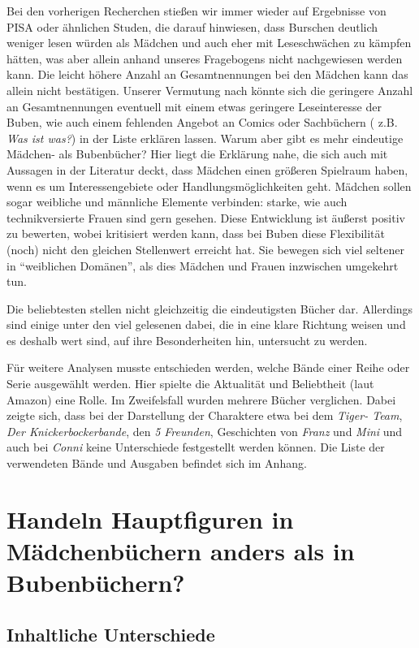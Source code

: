 Bei den vorherigen Recherchen stießen wir immer wieder auf Ergebnisse
von PISA oder ähnlichen Studen, die darauf hinwiesen, dass Burschen
deutlich weniger lesen würden als Mädchen und auch eher mit
Leseschwächen zu kämpfen hätten, was aber allein anhand unseres
Fragebogens nicht nachgewiesen werden kann. Die leicht höhere Anzahl an
Gesamtnennungen bei den Mädchen kann das allein nicht bestätigen.
Unserer Vermutung nach könnte sich die geringere Anzahl an
Gesamtnennungen eventuell mit einem etwas geringere Leseinteresse der
Buben, wie auch einem fehlenden Angebot an Comics oder Sachbüchern (
z.B. \emph{Was ist was?}) in der Liste erklären lassen. Warum aber gibt
es mehr eindeutige Mädchen- als Bubenbücher? Hier liegt die Erklärung
nahe, die sich auch mit Aussagen in der Literatur deckt, dass Mädchen
einen größeren Spielraum haben, wenn es um Interessengebiete oder
Handlungsmöglichkeiten geht. Mädchen sollen sogar weibliche und
männliche Elemente verbinden: starke, wie auch technikversierte Frauen
sind gern gesehen. Diese Entwicklung ist äußerst positiv zu bewerten,
wobei kritisiert werden kann, dass bei Buben diese Flexibilität (noch)
nicht den gleichen Stellenwert erreicht hat. Sie bewegen sich viel
seltener in ``weiblichen Domänen'', als dies Mädchen und Frauen
inzwischen umgekehrt tun.

Die beliebtesten stellen nicht gleichzeitig die eindeutigsten Bücher
dar. Allerdings sind einige unter den viel gelesenen dabei, die in eine
klare Richtung weisen und es deshalb wert sind, auf ihre Besonderheiten
hin, untersucht zu werden.

Für weitere Analysen musste entschieden werden, welche Bände einer Reihe
oder Serie ausgewählt werden. Hier spielte die Aktualität und
Beliebtheit (laut Amazon) eine Rolle. Im Zweifelsfall wurden mehrere
Bücher verglichen. Dabei zeigte sich, dass bei der Darstellung der
Charaktere etwa bei dem \emph{Tiger- Team}, \emph{Der
Knickerbockerbande}, den \emph{5 Freunden}, Geschichten von \emph{Franz}
und \emph{Mini} und auch bei \emph{Conni} keine Unterschiede
festgestellt werden können. Die Liste der verwendeten Bände und Ausgaben
befindet sich im Anhang.

\chapter{Handeln Hauptfiguren in Mädchenbüchern anders als in
Bubenbüchern?}

\section{Inhaltliche Unterschiede}

